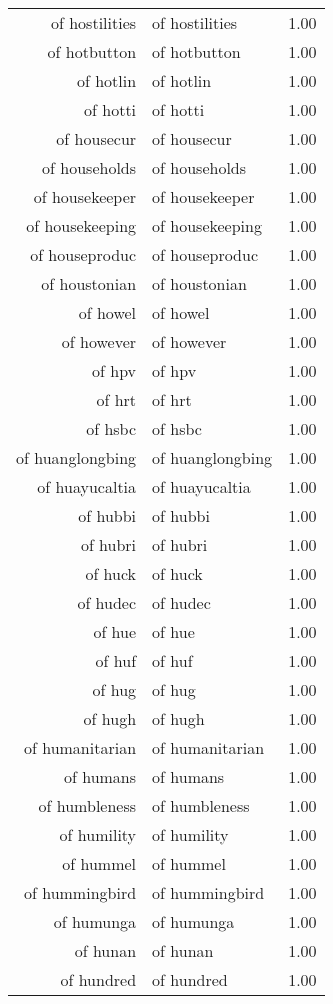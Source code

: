 \begin{table}[ht]
\begin{tabular}{rlr}
  of hostilities & of hostilities & 1.00 \\ 
  of hotbutton & of hotbutton & 1.00 \\ 
  of hotlin & of hotlin & 1.00 \\ 
  of hotti & of hotti & 1.00 \\ 
  of housecur & of housecur & 1.00 \\ 
  of households & of households & 1.00 \\ 
  of housekeeper & of housekeeper & 1.00 \\ 
  of housekeeping & of housekeeping & 1.00 \\ 
  of houseproduc & of houseproduc & 1.00 \\ 
  of houstonian & of houstonian & 1.00 \\ 
  of howel & of howel & 1.00 \\ 
  of however & of however & 1.00 \\ 
  of hpv & of hpv & 1.00 \\ 
  of hrt & of hrt & 1.00 \\ 
  of hsbc & of hsbc & 1.00 \\ 
  of huanglongbing & of huanglongbing & 1.00 \\ 
  of huayucaltia & of huayucaltia & 1.00 \\ 
  of hubbi & of hubbi & 1.00 \\ 
  of hubri & of hubri & 1.00 \\ 
  of huck & of huck & 1.00 \\ 
  of hudec & of hudec & 1.00 \\ 
  of hue & of hue & 1.00 \\ 
  of huf & of huf & 1.00 \\ 
  of hug & of hug & 1.00 \\ 
  of hugh & of hugh & 1.00 \\ 
  of humanitarian & of humanitarian & 1.00 \\ 
  of humans & of humans & 1.00 \\ 
  of humbleness & of humbleness & 1.00 \\ 
  of humility & of humility & 1.00 \\ 
  of hummel & of hummel & 1.00 \\ 
  of hummingbird & of hummingbird & 1.00 \\ 
  of humunga & of humunga & 1.00 \\ 
  of hunan & of hunan & 1.00 \\ 
  of hundred & of hundred & 1.00 \\ 

\end{tabular}
\end{table}
